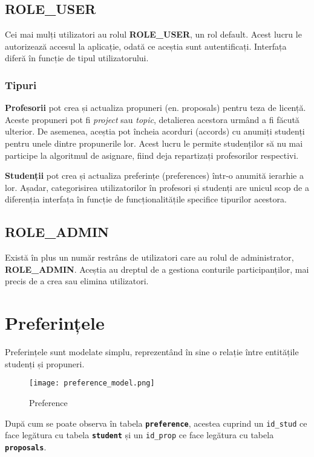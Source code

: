 \subsection{ROLE\_USER}

Cei mai mulți utilizatori au rolul \textbf{ROLE\_USER}, un rol default. Acest lucru le autorizează accesul la aplicație, odată ce aceștia sunt autentificați. Interfața diferă în funcție de tipul utilizatorului.

\subsubsection{Tipuri}

\textbf{Profesorii} pot crea și actualiza propuneri (en. proposals) pentru teza de licență. Aceste propuneri pot fi \textit{project} sau \textit{topic}, detalierea acestora urmând a fi făcută ulterior. De asemenea, aceștia pot încheia acorduri (accords) cu anumiți studenți pentru unele dintre propunerile lor. Acest lucru le permite studenților să nu mai participe la algoritmul de asignare, fiind deja repartizați profesorilor respectivi.

\textbf{Studenții} pot crea și actualiza preferințe (preferences) într-o anumită ierarhie a lor. Așadar, categorisirea utilizatorilor în profesori și studenți are unicul scop de a diferenția interfața în funcție de funcționalitățile specifice tipurilor acestora.


\subsection{ROLE\_ADMIN}

Există în plus un număr restrâns de utilizatori care au rolul de administrator, \textbf{ROLE\_ADMIN}. Aceștia au dreptul de a gestiona conturile participanților, mai precis de a crea sau elimina utilizatori.

\section{Preferințele}

Preferințele sunt modelate simplu, reprezentând în sine o relație între entitățile studenți și propuneri.

\begin{figure}[H]
	\centering
	\texttt{[image: preference\_model.png]}
	\caption{Preference}
\end{figure}

După cum se poate observa în tabela \textbf{\texttt{preference}}, acestea cuprind un \texttt{id\_stud} ce face legătura cu tabela \textbf{\texttt{student}} și un \texttt{id\_prop} ce face legătura cu tabela \textbf{\texttt{proposals}}.

